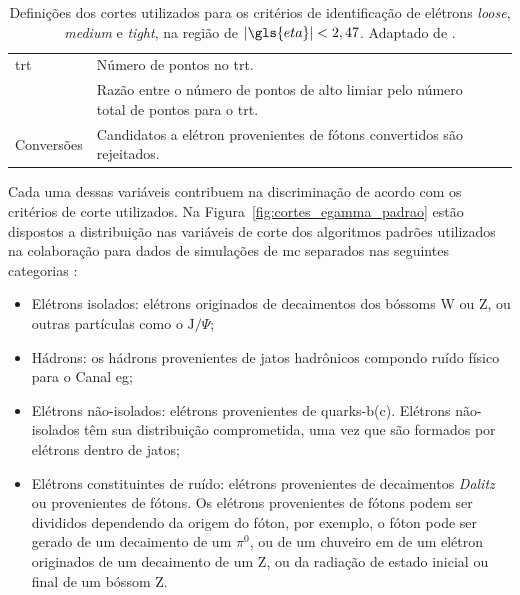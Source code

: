 \begin{table}[p]
{\begin{tabular}{p{4cm}p{9cm}c}
\hline
\gls{trt} & Número de pontos no \gls{trt}. & \\
 & Razão entre o número de pontos de alto limiar pelo número total de pontos para o
\gls{trt}. & \\
\hline
Conversões & Candidatos a elétron provenientes de fótons convertidos são
rejeitados. & \\
\hline
\hline
\end{tabular}
}
\caption[Definições dos cortes utilizados para os critérios de identificação de elétrons \emph{loose}, \emph{medium}
e \emph{tight}, na região de $|\eta|<2,47$]
{Definições dos cortes utilizados para os critérios de identificação de elétrons \emph{loose}, \emph{medium}
e \emph{tight}, na região de $|\gls{eta}|<2,47$. Adaptado de \cite{expected_perf_2011}.}
\label{tab:cortes_em}
\end{table}

Cada uma dessas variáveis contribuem na discriminação de acordo com os critérios
de corte utilizados. Na Figura~\ref{fig:cortes_egamma_padrao} estão dispostos a
distribuição nas variáveis de corte dos algoritmos padrões utilizados na
colaboração para dados de simulações de \gls{mc} separados nas seguintes 
categorias \cite{expected_perf_2011}:

\begin{itemize}
\item Elétrons isolados: elétrons originados de decaimentos dos
bóssoms W ou Z, ou outras partículas como o $\text{J}/\Psi$;
\item Hádrons: os hádrons provenientes de
jatos hadrônicos compondo ruído físico para o Canal \gls{eg};
\item Elétrons não-isolados: elétrons
provenientes de quarks-b(c). Elétrons não-isolados têm sua distribuição
comprometida, uma vez que são formados por elétrons dentro de jatos;
\item Elétrons constituintes de ruído: elétrons
provenientes de decaimentos \emph{Dalitz} ou provenientes de fótons. Os elétrons
provenientes de fótons podem ser divididos dependendo da origem do fóton, por
exemplo, o fóton pode ser gerado de um decaimento de um $\pi^0$, ou de um
chuveiro \gls{em} de um elétron originados de um decaimento de um Z, ou da
radiação de estado inicial ou final de um bóssom Z.
\end{itemize}

